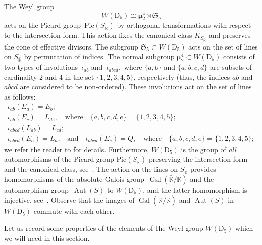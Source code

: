 \documentclass[12pt]{amsart}
\theoremstyle{definition}
\theoremstyle{remark}
\newcommand{\KK}{\mathbb{K}}
\newcommand{\mumu}{{\boldsymbol{\mu}}}
\newcommand{\Aut}{\operatorname{Aut}}
\newcommand{\Gal}{\operatorname{Gal}}
\begin{document}
The Weyl group
$$
W(\mathrm{D}_5) \cong \mumu_2^4 \rtimes \mathfrak{S}_5
$$
acts on the Picard group~$\mathrm{Pic}(S_{\bar{\KK}})$ by orthogonal transformations with respect to the intersection form. This action fixes the canonical class
$K_{S_{\bar{\KK}}}$ and preserves the cone of effective divisors. The
subgroup $\mathfrak{S}_5 \subset W(\mathrm{D}_5)$ acts on the set of lines on $S_{\bar{\KK}}$ by permutation of indices.
The normal subgroup $\mumu_2^4 \subset W(\mathrm{D}_5)$
consists of two types of involutions~$\iota_{ab}$ and~$\iota_{abcd},$
where $\{a,b\}$ and $\{a,b,c,d\}$ are subsets of cardinality $2$ and $4$
in the set $\{1,2,3,4,5\}$, respectively (thus, the indices $ab$ and $abcd$
are considered to be non-ordered). These involutions act on the set of lines as follows:
\begin{gather*}
\iota_{ab}(E_a)=E_b;\\
\iota_{ab}(E_c)=L_{de}, \quad \text{where} \quad
\{a,b,c,d,e\}=\{1,2,3,4,5\};\\
\iota_{abcd}(L_{ab})=L_{cd};\\
\iota_{abcd}(E_a)=L_{ae} \quad \text{and} \quad \iota_{abcd}(E_e)=Q,
\quad \text{where} \quad \{a,b,c,d,e\}=\{1,2,3,4,5\};
\end{gather*}
we refer the reader to \cite[\S6.4]{DI} for details.
Furthermore, $W(\mathrm{D}_5)$ is the group of \emph{all} automorphisms of the Picard group $\mathrm{Pic}(S_{\bar{\KK}})$
preserving the intersection form and the canonical class, see~\cite[Theorem~23.9]{Manin-CubicForms}.
The action on the lines on $S_{\bar{\KK}}$ provides homomorphisms of the absolute Galois group~$\Gal(\bar{\KK}/\KK)$
and the automorphism group~\mbox{$\Aut(S)$}
to $W(\mathrm{D}_5)$, and the latter homomorphism is injective,
see~\mbox{\cite[Corollary 8.2.40]{Dolgachev}}.
Observe that the images of $\Gal(\bar{\KK}/\KK)$ and $\Aut(S)$ in~$W(\mathrm{D}_5)$ commute with each other.


Let us record some properties of the elements of the Weyl group $W(\mathrm{D}_5)$
which we will need in this section.
\end{document}
